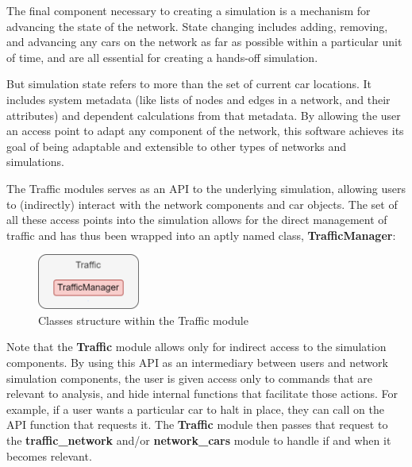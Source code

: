 \par The final component necessary to creating a simulation  is a mechanism for advancing the state of the network.  State changing includes adding, removing, and advancing any cars on the network as far as possible within a particular unit of time, and are all essential for creating a hands-off simulation. \\

\par But simulation state refers to more than the set of current car locations.  It includes system metadata (like lists of nodes and edges in a network, and their attributes) and dependent calculations from that metadata.  By allowing the user an access point to adapt any component of the network, this software achieves its goal of being adaptable and extensible to other types of networks and simulations.  \\

\par The Traffic modules serves as an API to the underlying simulation, allowing users to (indirectly) interact with the network components and car objects.  The set of all these access points into the simulation allows for the direct management of traffic and has thus been wrapped into an aptly named class,  \textbf{TrafficManager}:

\begin{figure}[H]
    \centering
	\includegraphics[width=0.3\textwidth]{tex files/Figures/traffic_manager_module.png}
	\caption[State Module:  Traffic\_cars]{Classes structure within the Traffic module}
	\label{fig:traffic_module}
\end{figure}


\noindent  Note that the \textbf{Traffic} module allows only for indirect access to the simulation components.  By using this API as an intermediary between users and network simulation components, the user is given access only to commands that are relevant to analysis, and hide internal functions that facilitate those actions.  For example, if a user wants a particular car to halt in place, they can call on the API function that requests it.  The \textbf{Traffic} module then passes that request to the \textbf{traffic\_network} and/or \textbf{network\_cars} module to handle if and when it becomes relevant.


